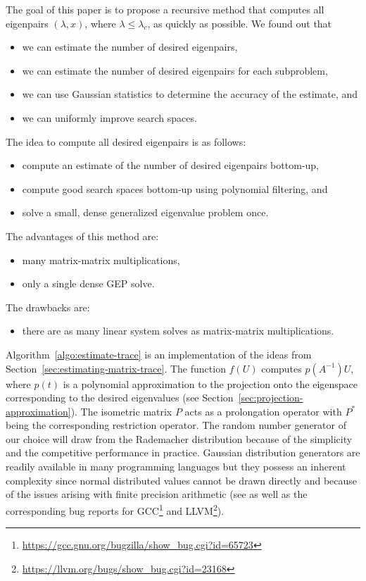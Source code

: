 \documentclass[%
	paper=a4,
	fontsize=10pt,
	DIV11,BCOR10mm,
	numbers=noenddot,
	abstract=yes
]{scrartcl}
\theoremstyle{definition}
\begin{document}
The goal of this paper is to propose a recursive method that computes all
eigenpairs $(\lambda, x)$, where $\lambda \leq \lambda_c$, as quickly as
possible. We found out that
\begin{itemize}
	\item we can estimate the number of desired eigenpairs,
	\item we can estimate the number of desired eigenpairs for each subproblem,
	\item we can use Gaussian statistics to determine the accuracy of the
		estimate, and
	\item we can uniformly improve search spaces.
\end{itemize}
The idea to compute all desired eigenpairs is as follows:
\begin{itemize}
	\item compute an estimate of the number of desired eigenpairs bottom-up,
	\item compute good search spaces bottom-up using polynomial filtering, and
	\item solve a small, dense generalized eigenvalue problem once.
\end{itemize}
The advantages of this method are:
\begin{itemize}
	\item many matrix-matrix multiplications,
	\item only a single dense GEP solve.
\end{itemize}
The drawbacks are:
\begin{itemize}
	\item there are as many linear system solves as matrix-matrix
		multiplications.
\end{itemize}

Algorithm~\ref{algo:estimate-trace} is an implementation of the ideas from
Section~\ref{sec:estimating-matrix-trace}. The function $f(U)$ computes
$p(A^{-1}) U$, where $p(t)$ is a polynomial approximation to the projection onto
the eigenspace corresponding to the desired eigenvalues (see
Section~\ref{sec:projection-approximation}). The isometric matrix $P$ acts as a
prolongation operator with $P^*$ being the corresponding restriction operator.
The random number generator of our choice will draw from the Rademacher
distribution because of the simplicity and the competitive performance in
practice. Gaussian distribution generators are readily available in many
programming languages but they possess an inherent complexity since normal
distributed values cannot be drawn directly \cite[§3.4]{Knuth1998} and because
of the issues arising with finite precision arithmetic (see \cite{Grabowski2015}
as well as the corresponding bug reports for
GCC\footnote{\url{https://gcc.gnu.org/bugzilla/show_bug.cgi?id=65723}} and
LLVM\footnote{\url{https://llvm.org/bugs/show_bug.cgi?id=23168}}).
\end{document}
